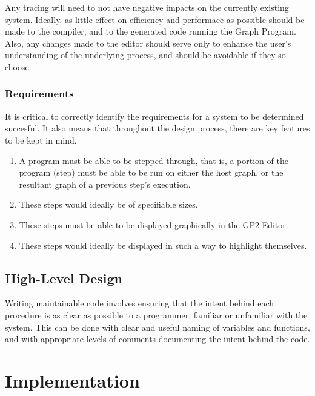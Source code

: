 \documentclass{UoYCSproject}
\begin{document}
Any tracing will need to not have negative impacts on the currently existing system. Ideally, as little effect on efficiency and performace as possible should be made to the compiler, and to the generated code running the Graph Program. Also, any changes made to the editor should serve only to enhance the user's understanding of the underlying process, and should be avoidable if they so choose.

\subsection{Requirements}
It is critical to correctly identify the requirements for a system to be determined succesful. It also means that throughout the design process, there are key features to be kept in mind. 
\begin{enumerate}
	\item A program must be able to be stepped through, that is, a portion of the program (step) must be able to be run on either the host graph, or the resultant graph of a previous step's execution.
	\item These steps would ideally be of specifiable sizes.
	\item These steps must be able to be displayed graphically in the GP2 Editor.
	\item These steps would ideally be displayed in such a way to highlight themselves.
\end{enumerate}



\section{High-Level Design}
Writing maintainable code involves ensuring that the intent behind each procedure is as clear as possible to a programmer, familiar or unfamiliar with the system. This can be done with clear and useful naming of variables and functions, and with appropriate levels of comments documenting the intent behind the code.

 
\chapter{Implementation}

\end{document}
